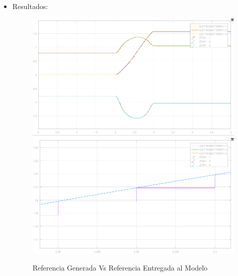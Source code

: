 \begin{itemize}
		\item Resultados: \\ 		
		\begin{figure}[h!]
			\centering
			\includegraphics[width=.4\textwidth]{ZoHComparativa} \hspace{0.2cm} \includegraphics[width=.4\textwidth]{ZoHComparativaDetalle}
			\caption{Referencia Generada Vs Referencia Entregada al Modelo}
		\end{figure}
					
		
			

	\end{itemize}
			  
	